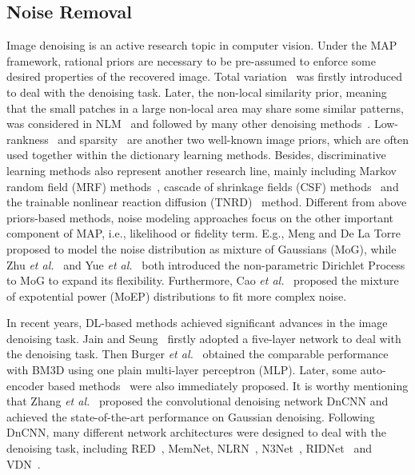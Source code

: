 \documentclass[runningheads]{llncs}
\begin{document}
\subsection{Noise Removal}
Image denoising is an active research topic in computer vision. Under the MAP framework, rational priors
are necessary to be pre-assumed to enforce some desired properties of the recovered image.
Total variation~\cite{rudin1992nonlinear}
was firstly introduced to deal with the denoising task. Later, the non-local similarity prior, meaning that
the small patches in a large non-local area may share some similar patterns,
was considered in NLM~\cite{buades2005non} and followed by many other denoising
methods~\cite{dabov2007image,dong2012nonlocal,Mairal2009,Lebrun2013}.
Low-rankness~\cite{dong2012nonlocal,gu2014weighted,yong2017robust,MCWNNM} and
sparsity~\cite{mairal2007sparse,xie2017kronecker,Mairal2009,zhou2009non,Xu_2018_ECCV} are another two well-known image priors, which are
often used together within the dictionary learning methods. Besides, discriminative learning methods also represent
another research line, mainly including Markov random field (MRF) methods~\cite{Barbu2009,Samuel2009,Sun2011},
cascade of shrinkage fields (CSF) methods~\cite{Schmidt2014,Schmidt2017} and the trainable nonlinear reaction
diffusion (TNRD)~\cite{Chen2017} method. Different from above priors-based methods, noise modeling approaches
focus on the other important component of MAP, i.e., likelihood or fidelity term. E.g., Meng and
De La Torre~\cite{Meng_2013_ICCV}
proposed to model the noise distribution as mixture of Gaussians (MoG), while
Zhu \textit{et al.}~\cite{zhu2016blind} and Yue \textit{et al.}~\cite{yue2019robust} both introduced the
non-parametric Dirichlet Process to MoG to expand its flexibility. Furthermore,
Cao \textit{et al.}~\cite{Cao_2015_ICCV} proposed the mixture of expotential
power (MoEP) distributions to fit more complex noise.

In recent years, DL-based methods achieved significant advances in the image denoising task. Jain and
Seung~\cite{Jain2008} firstly adopted a five-layer network to deal with the denoising task. Then Burger
\textit{et al.}~\cite{Burger2012} obtained the comparable performance with BM3D using one plain multi-layer
perceptron (MLP). Later, some auto-encoder based methods~\cite{Xie2012,Agostinelli2013} were also immediately
proposed. It is worthy mentioning that Zhang \textit{et al.}~\cite{zhang2017beyond} proposed the convolutional
denoising network DnCNN and achieved the state-of-the-art performance on Gaussian denoising. Following DnCNN,
many different network architectures were designed to deal with the denoising task, including 
RED~\cite{Mao2016}, MemNet\cite{Tai2017}, NLRN~\cite{Liu2018}, N3Net~\cite{Ploetz2018},
RIDNet~\cite{anwar2019real} and VDN~\cite{yue2019variational}.
\end{document}
